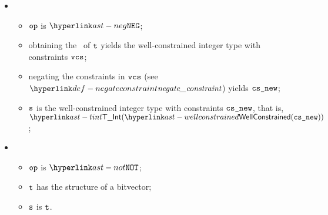 \begin{itemize}
\item {}
\begin{itemize}
  \item $\op$ is $\NEG$;
  \item obtaining the \wellconstrainedstructure\ of $\vt$ yields the well-constrained integer type with constraints $\vcs$\ProseOrTypeError;
  \item negating the constraints in $\vcs$ (see $\negateconstraint$) yields $\vcsnew$;
  \item $\vs$ is the well-constrained integer type with constraints $\vcsnew$, that is, \\
  $\TInt(\wellconstrained(\vcsnew))$;
\end{itemize}

\item {}
  \begin{itemize}
  \item $\op$ is $\NOT$;
  \item $\vt$ has the structure of a bitvector;
  \item $\vs$ is $\vt$.
  \end{itemize}
\end{itemize}

\FormallyParagraph
\begin{mathpar}
\end{mathpar}

\begin{mathpar}
\end{mathpar}

\begin{mathpar}
\end{mathpar}

